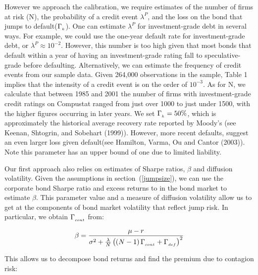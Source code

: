 \documentclass[titlepage,11pt]{article}
\begin{document}
However we approach the calibration, we require estimates of the number of
firms at risk (N), the probability of a credit event $\lambda^{P}$, and the
loss on the bond that jumps to default($\Gamma_{_{{k}}}$). One can estimate
$\lambda^{P}$ for
investment-grade debt in several ways. For example, we could use the one-year
default rate for investment-grade debt, or $\lambda^{P} \approx 10^{-2}$.
However, this
number is too high given that most bonds that default within a
year of having an investment-grade rating fall to speculative-grade before
defaulting.
Alternatively, we can estimate the frequency of credit events from our sample
data.
Given 264,000 observations in the sample, Table 1 implies that the intensity of
a credit event is on the order of $10^{-3}$.
As for N, we calculate that between 1985 and 2001 the number
of firms with investment-grade credit ratings on Compustat ranged from just
over 1000 to just
under 1500, with the higher figures occurring in later
years. We set $\Gamma_{_{{k}}}=50\%$, which is
approximately the historical average recovery rate reported by Moody's (see
Keenan, Shtogrin, and
Sobehart (1999)).\nocite{keesht99} However, more recent defaults,
suggest an even larger loss given default(see Hamilton, Varma, Ou and Cantor
(2003)). Note this parameter has an upper bound of one due to limited
liability.

Our first approach also relies on estimates of Sharpe ratios, $\beta$ and
diffusion volatility.  Given the assumptions in section~(\ref{jumpsize}), we
can use the corporate bond Sharpe ratio and excess returns to in the bond
market to estimate $\beta$.  This parameter value and a measure of diffusion
volatility allow us to get at the components of bond market volatility that
reflect jump risk.  In particular, we obtain $\Gamma_{_{{cont}}}$ from:

\[\beta = \frac{\mu - r}{\sigma^{2} +  \frac{\lambda}{N}
\left( \left( N-1 \right) \Gamma_{_{{cont}}} + \Gamma_{_{{def}}}
\right)^{2}}\]

\noindent This allows us to decompose bond returns and find the premium due to
contagion risk:
\end{document}
